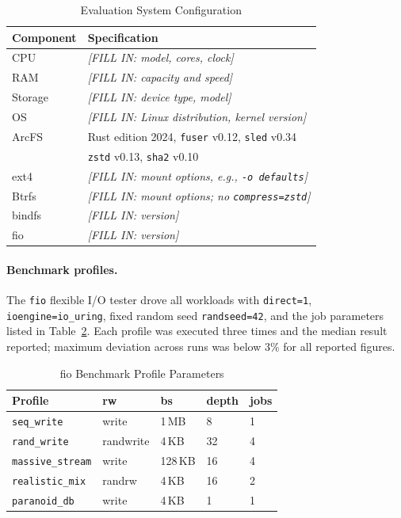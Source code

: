 \documentclass[5p,times]{elsarticle}
\begin{document}
\begin{table}[t]
\caption{Evaluation System Configuration}
\label{tab:sysconfig}
\centering
\renewcommand{\arraystretch}{1.2}
\footnotesize
\begin{tabular}{p{1.6cm}p{5.8cm}}
\toprule
\textbf{Component} & \textbf{Specification} \\
\midrule
CPU           & \textit{[FILL IN: model, cores, clock]} \\
RAM           & \textit{[FILL IN: capacity and speed]} \\
Storage       & \textit{[FILL IN: device type, model]} \\
OS            & \textit{[FILL IN: Linux distribution, kernel version]} \\
\midrule
ArcFS         & Rust edition 2024, \texttt{fuser} v0.12, \texttt{sled} v0.34 \\
              & \texttt{zstd} v0.13, \texttt{sha2} v0.10 \\
ext4          & \textit{[FILL IN: mount options, e.g., \texttt{-o defaults}]} \\
Btrfs         & \textit{[FILL IN: mount options; no \texttt{compress=zstd}]} \\
bindfs        & \textit{[FILL IN: version]} \\
fio           & \textit{[FILL IN: version]} \\
\bottomrule
\end{tabular}
\end{table}

\paragraph{Benchmark profiles.}
The \texttt{fio} flexible I/O tester drove all workloads with
\texttt{direct=1}, \texttt{ioengine=io\_uring}, fixed random seed
\texttt{randseed=42}, and the job parameters listed in
Table~\ref{tab:fio}.  Each profile was executed three times and the
median result reported; maximum deviation across runs was below 3\%
for all reported figures.

\begin{table}[t]
\caption{fio Benchmark Profile Parameters}
\label{tab:fio}
\centering
\renewcommand{\arraystretch}{1.2}
\footnotesize
\begin{tabular}{p{2.1cm}llll}
\toprule
\textbf{Profile} & \textbf{rw} & \textbf{bs} & \textbf{depth} & \textbf{jobs} \\
\midrule
\texttt{seq\_write}     & write      & 1\,MB   & 8  & 1 \\
\texttt{rand\_write}    & randwrite  & 4\,KB   & 32 & 4 \\
\texttt{massive\_stream}& write      & 128\,KB & 16 & 4 \\
\texttt{realistic\_mix} & randrw     & 4\,KB   & 16 & 2 \\
\texttt{paranoid\_db}   & write      & 4\,KB   & 1  & 1 \\
\bottomrule
\end{tabular}
\end{table}
\end{document}
